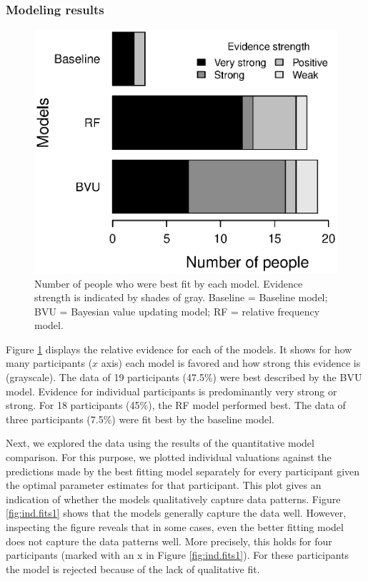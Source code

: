 \documentclass[a4paper,man, natbib]{apa6} %
\begin{document}
\subsubsection{Modeling results}
\begin{figure}[htbp] 
  \centering
\includegraphics[width=.8\linewidth, keepaspectratio]{modelcomp1.eps}
  \caption{Number of people who were best fit by each model. Evidence strength is indicated by shades of gray. Baseline = Baseline model; BVU = Bayesian value updating model; RF = relative frequency model.}
  \label{fig:modeling1}
\end{figure}
Figure \ref{fig:modeling1} displays the relative evidence for each of the models. It shows for how many participants ($x$ axis) each model is favored and how strong this evidence is (grayscale). The data of 19 participants (47.5\%) were best described by the BVU model. Evidence for individual participants is predominantly very strong or strong. For 18 participants (45\%), the RF model performed best. The data of three participants (7.5\%) were fit best by the baseline model.

Next, we explored the data using the results of the quantitative model comparison. For this purpose, we plotted individual valuations against the predictions made by the best fitting model separately for every participant given the optimal parameter estimates for that participant. This plot gives an indication of whether the models qualitatively capture data patterns. Figure \ref{fig:ind.fits1} shows that the models generally capture the data well. However, inspecting the figure reveals that in some cases, even the better fitting model does not capture the data patterns well. More precisely, this holds for four participants (marked with an x in Figure \ref{fig:ind.fits1}). For these participants the model is rejected because of the lack of qualitative fit.%
\end{document}
